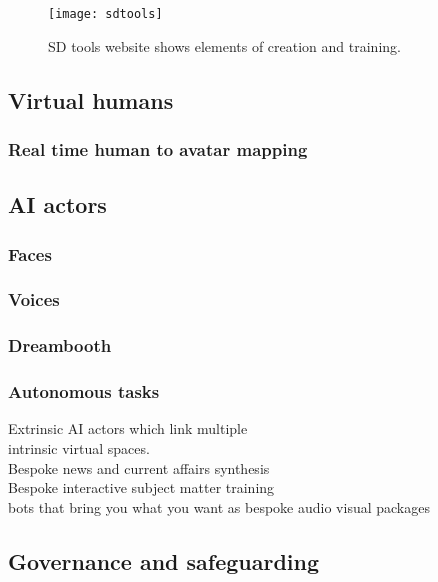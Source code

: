 \begin{figure}
  \centering
    \texttt{[image: sdtools]}
  \caption{SD tools website shows elements of creation and training.}
  	\label{fig:SDTools}
\end{figure}


\subsection{Virtual humans}
\subsubsection{Real time human to avatar mapping}
\subsection{AI actors}
\subsubsection{Faces}
\subsubsection{Voices}
\subsubsection{Dreambooth}
\subsubsection{Autonomous tasks}

Extrinsic AI actors which link multiple\\ intrinsic virtual spaces.\\
Bespoke news and current affairs synthesis\\
Bespoke interactive subject matter training\\
bots that bring you what you want as bespoke audio visual packages
\subsection{Governance and safeguarding}
